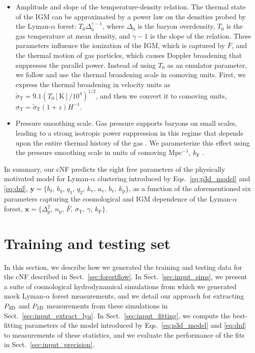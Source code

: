\documentclass[longauth]{aa}
\newcommand{\lya}{Lyman-$\alpha$\xspace}
\newcommand{\lyaf}{Lyman-$\alpha$ forest\xspace}
\newcommand{\poned}{\ensuremath{P_{\rm 1D}}\xspace}
\newcommand{\pthreed}{\ensuremath{P_{\rm 3D}}\xspace}
\newcommand{\mflux}{\ensuremath{\bar{F}}\xspace}
\begin{document}
\begin{itemize}
    \item Amplitude and slope of the temperature-density relation. The thermal state of the IGM can be approximated by a power law on the densities probed by the \lyaf \citep{hydro_Lukic2015}: $T_0\Delta_\mathrm{b}^{\gamma-1}$, where $\Delta_\mathrm{b}$ is the baryon overdensity, $T_0$ is the gas temperature at mean density, and $\gamma-1$ is the slope of the relation. These parameters influence the ionization of the IGM, which is captured by \mflux, and the thermal motion of gas particles, which causes Doppler broadening that suppresses the parallel power. Instead of using $T_0$ as an emulator parameter, we follow \citet{Pedersen2021} and use the thermal broadening scale in comoving units. First, we express the thermal broadening in velocity units as $\tilde{\sigma}_\mathrm{T} = 9.1 (T_0[\mathrm{K}]/10^4)^{1/2}$, and then we convert it to comoving units, $\sigma_\mathrm{T}=\tilde{\sigma}_\mathrm{T}(1+z) H^{-1}$.

    \item Pressure smoothing scale. Gas pressure supports baryons on small scales, leading to a strong isotropic power suppression in this regime that depends upon the entire thermal history of the gas \citep{gnedin1998ProbingUniverseLyalpha}. We parameterize this effect using the pressure smoothing scale in units of comoving Mpc$^{-1}$, $k_\mathrm{F}$ \citep[see][for more details]{Pedersen2021}.
\end{itemize}

In summary, our cNF predicts the eight free parameters of the physically motivated model for \lya clustering introduced by Eqs.~\ref{eq:p3d_model} and \ref{eq:dnl}, $\mathbf{y}=\{b_\delta,\, b_\eta,\, q_1,\, q_2,\, k_\mathrm{v},\, a_\mathrm{v},\, b_\mathrm{v}, \, k_\mathrm{p}\}$, as a function of the aforementioned six parameters capturing the cosmological and IGM dependence of the \lyaf, $\mathbf{x}=\{\Delta_\mathrm{p}^2,\, n_\mathrm{p},\, \mflux,\, \sigma_\mathrm{T},\, \gamma,\, k_\mathrm{F}\}$.


\section{Training and testing set}
\label{sec:input}

In this section, we describe how we generated the training and testing data for the cNF described in Sect.~\ref{sec:forestflow}. In Sect.~\ref{sec:input_sims}, we present a suite of cosmological hydrodynamical simulations from which we generated mock \lyaf measurements, and we detail our approach for extracting \pthreed and \poned measurements from these simulations in Sect.~\ref{sec:input_extract_lya}. In Sect.~\ref{sec:input_fitting}, we compute the best-fitting parameters of the model introduced by Eqs.~\ref{eq:p3d_model} and \ref{eq:dnl} to measurements of these statistics, and we evaluate the performance of the fits in Sect.~\ref{sec:input_precision}.
\end{document}
